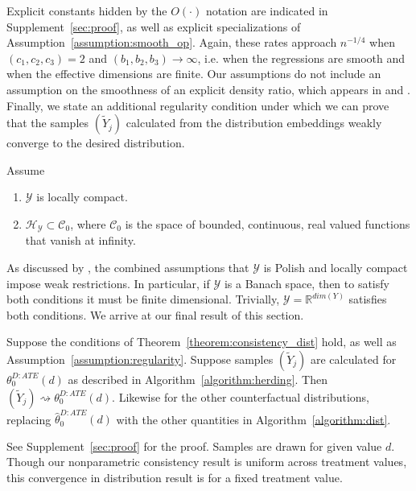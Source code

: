 Explicit constants hidden by the $O(\cdot)$ notation are indicated in Supplement~\ref{sec:proof}, as well as explicit specializations of Assumption~\ref{assumption:smooth_op}. Again, these rates approach $n^{-1/4}$ when $(c_1,c_2,c_3)=2$ and $(b_1,b_2,b_3)\rightarrow \infty$, i.e. when the regressions are smooth and when the effective dimensions are finite. Our assumptions do not include an assumption on the smoothness of an explicit density ratio, which appears in \cite[Theorem 11]{fukumizu2013kernel} and \cite[Assumption 3]{muandet2021counterfactual}. Finally, we state an additional regularity condition under which we can prove that the samples $(\tilde{Y}_j)$ calculated from the distribution embeddings weakly converge to the desired distribution.
\begin{assumption}\label{assumption:regularity}
Assume
\begin{enumerate}
    \item $\mathcal{Y}$ is locally compact.
    \item $\mathcal{H}_{\mathcal{Y}}\subset\mathcal{C}_0$, where $\mathcal{C}_0$ is the space of bounded, continuous, real valued functions that vanish at infinity.
\end{enumerate}
\end{assumption}
As discussed by \cite{simon2020metrizing}, the combined assumptions that $\mathcal{Y}$ is Polish and locally compact impose weak restrictions. In particular, if $\mathcal{Y}$ is a Banach space, then to satisfy both conditions it must be finite dimensional. Trivially, $\mathcal{Y}=\mathbb{R}^{dim(Y)}$ satisfies both conditions. We arrive at our final result of this section.
\begin{theorem}\label{theorem:conv_dist}
Suppose the conditions of Theorem~\ref{theorem:consistency_dist} hold, as well as Assumption~\ref{assumption:regularity}. Suppose samples $(\tilde{Y}_j)$ are calculated for $\theta_0^{D:ATE}(d)$ as described in Algorithm~\ref{algorithm:herding}. Then $(\tilde{Y}_j)\rightsquigarrow \theta_0^{D:ATE}(d)$. Likewise for the other counterfactual distributions, replacing $\hat{\theta}_0^{D:ATE}(d)$ with the other quantities in Algorithm~\ref{algorithm:dist}.
\end{theorem}
See Supplement~\ref{sec:proof} for the proof. Samples are drawn for given value $d$. Though our nonparametric consistency result is uniform across treatment values, this convergence in distribution result is for a fixed treatment value.